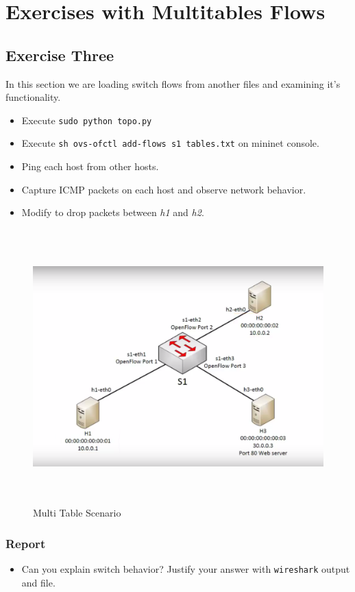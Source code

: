 \documentclass{../UTNetLab}
\begin{document}
\section{Exercises with Multitables Flows}
    \subsection*{Exercise Three}
    In this section we are loading switch flows from another files and examining it's functionality.

    \begin{itemize}
    	\item Execute \lstinline{sudo python topo.py} 
    	\item Execute \lstinline{sh ovs-ofctl add-flows s1 tables.txt} on mininet console.
    	\item Ping each host from other hosts.
    	\item Capture ICMP packets on each host and observe network behavior.
    	\item Modify  to drop packets between \textit{h1} and \textit{h2}.
    \end{itemize}

    \begin{figure}[H]
    	\centering
    	\includegraphics[height=300pt]{img/fig2.png}
    	\caption{Multi Table Scenario}
    	\label{fig:MultiTableScenario}
    \end{figure}


    \subsubsection*{Report}
    \begin{itemize}
    	\item Can you explain switch behavior? Justify your answer with \lstinline{wireshark} output and  file.
    \end{itemize}
\end{document}
